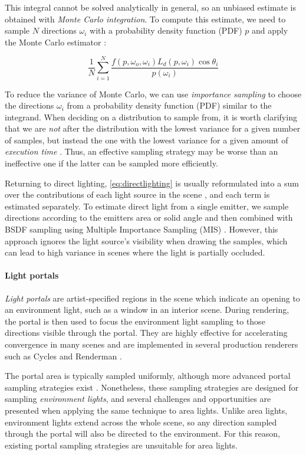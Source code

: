 This integral cannot be solved analytically in general, so an unbiased estimate is obtained with \emph{Monte Carlo integration}. To compute this estimate, we need to sample $N$ directions $\omega_i$ with a probability density function (PDF) $p$ and apply the Monte Carlo estimator \cite{L1996MCTAOFPBR}:

\begin{equation}
  \frac{1}{N} \sum_{i=1}^N \frac{f(p, \omega_o, \omega_i) L_d(p, \omega_i) \cos\theta_i}{p(\omega_i)}
\end{equation}

To reduce the variance of Monte Carlo, we can use \emph{importance sampling} to choose the directions $\omega_i$ from a probability density function (PDF) similar to the integrand. When deciding on a distribution to sample from, it is worth clarifying that we are \emph{not} after the distribution with the lowest variance for a given number of samples, but instead the one with the lowest variance for a given amount of \emph{execution time} \cite{shirleyMonteCarloTechniques1996}. Thus, an effective sampling strategy may be worse than an ineffective one if the latter can be sampled more efficiently.

Returning to direct lighting, \autoref{eq:directlighting} is usually reformulated into a sum over the contributions of each light source in the scene \cite{shirleyMonteCarloTechniques1996}, and each term is estimated separately. To estimate direct light from a single emitter, we sample directions according to the emitters area or solid angle \cite*[]{shirleyMonteCarloTechniques1996} and then combined with BSDF sampling using Multiple Importance Sampling (MIS) \cite*[]{veachROBUSTMONTECARLO}. However, this approach ignores the light source's visibility when drawing the samples, which can lead to high variance in scenes where the light is partially occluded.

\paragraph{Light portals}
\emph{Light portals} are artist-specified regions in the scene which indicate an opening to an environment light, such as a window in an interior scene. During rendering, the portal is then used to focus the environment light sampling to those directions visible through the portal. They are highly effective for accelerating convergence in many scenes and are implemented in several production renderers such as Cycles \cite{blenderfoundationLightSettingsBlender} and Renderman \cite{pixaranimationstudiosPxrPortalLight}.

The portal area is typically sampled uniformly, although more advanced portal sampling strategies exist \cite{ogakiGeneralizedLightPortals2020}\cite{bitterliPortalMaskedEnvironment2015}. Nonetheless, these sampling strategies are designed for sampling \emph{environment lights}, and several challenges and opportunities are presented when applying the same technique to area lights. Unlike area lights, environment lights extend across the whole scene, so any direction sampled through the portal will also be directed to the environment. For this reason, existing portal sampling strategies are unsuitable for area lights.